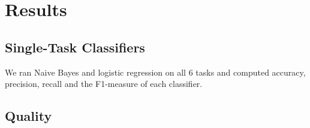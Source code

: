 \section{Results}
\subsection{Single-Task Classifiers}
We ran Naive Bayes and logistic regression on all 6 tasks and computed accuracy, precision, recall and the F1-measure of each classifier.
\subsection{Quality}
